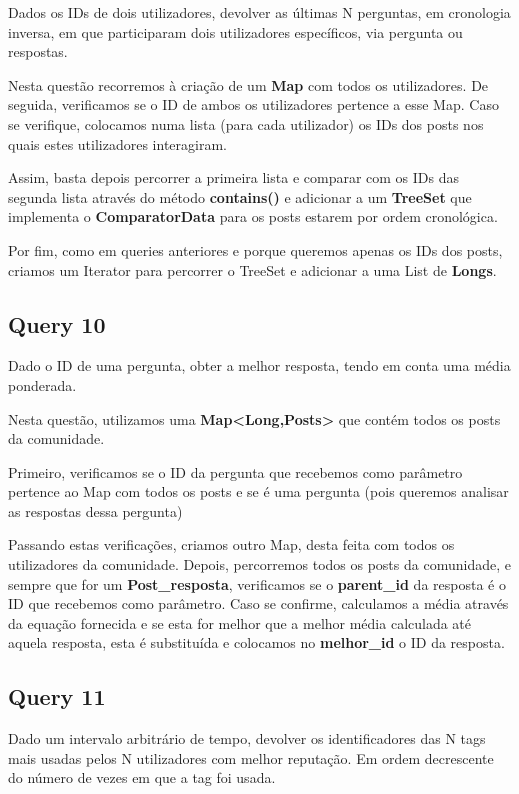 \documentclass[a4paper]{article}
\begin{document}
Dados os IDs de dois utilizadores, devolver as últimas N perguntas, em
cronologia inversa, em que participaram dois utilizadores específicos, 
via pergunta ou respostas.

Nesta questão recorremos à criação de um \textbf{Map} com todos os utilizadores. 
De seguida, verificamos se o ID de ambos os utilizadores pertence a esse Map.
Caso se verifique, colocamos numa lista (para cada utilizador) os IDs dos posts 
nos quais estes utilizadores interagiram.

Assim, basta depois percorrer a primeira lista e comparar com os IDs das segunda
lista através do método \textbf{contains()} e adicionar a um \textbf{TreeSet} que
implementa o \textbf{ComparatorData} para os posts estarem por ordem cronológica.

Por fim, como em queries anteriores e porque queremos apenas os IDs dos posts,
criamos um Iterator para percorrer o TreeSet e adicionar a uma List de \textbf{Longs}.

\subsection{Query 10}

Dado o ID de uma pergunta, obter a melhor resposta, tendo em conta
uma média ponderada.

Nesta questão, utilizamos uma \textbf{Map<Long,Posts>} que contém todos os posts 
da comunidade.

Primeiro, verificamos se o ID da pergunta que recebemos como parâmetro pertence ao
Map com todos os posts e se é uma pergunta (pois queremos analisar as respostas 
dessa pergunta)

Passando estas verificações, criamos outro Map, desta feita com todos os utilizadores
da comunidade. Depois, percorremos todos os posts da comunidade, e sempre que for um 
\textbf{Post\_resposta}, verificamos se o \textbf{parent\_id} da resposta é o ID que
recebemos como parâmetro. Caso se confirme, calculamos a média através da equação
fornecida e se esta for melhor que a melhor média calculada até aquela resposta, 
esta é substituída e colocamos no \textbf{melhor\_id} o ID da resposta.

\subsection{Query 11}

Dado um intervalo arbitrário de tempo, devolver os identificadores das N tags
mais usadas pelos N utilizadores com melhor reputação. Em ordem decrescente 
do número de vezes em que a tag foi usada.
\end{document}
